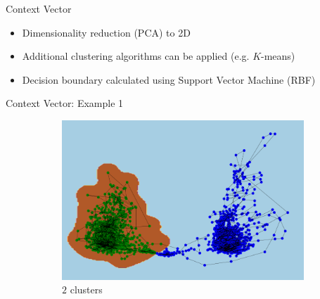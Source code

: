\documentclass{beamer}
\begin{document}
\begin{frame}{Context Vector}
  \begin{itemize}
    \item Dimensionality reduction (PCA) to 2D
    \item Additional clustering algorithms can be applied (e.g. \(K\)-means)
    \item Decision boundary calculated using Support Vector Machine (RBF)
  \end{itemize}
\end{frame}


\begin{frame}[shrink]{Context Vector: Example 1}
\begin{figure}[H]
	\centering
	\begin{subfigure}[b]{0.5\textwidth}
		\includegraphics[width=\textwidth]{pca_cluster_2.png}
		\caption{\(2\) clusters}
		\label{fig:pca_cluster_2}
	\end{subfigure}
	~
	\begin{subfigure}[b]{0.25\textwidth}

\end{subfigure}
\end{figure}
\end{frame}
\end{document}
